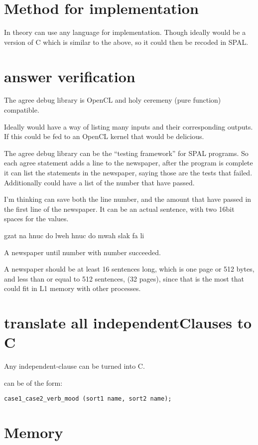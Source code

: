 \section{Method for implementation}
In theory can use any language for implementation.  
Though ideally would be a version of C which is similar to the above, 
so it could then be recoded in SPAL.\@

\section{answer verification}

The agree debug library is OpenCL and holy ceremeny (pure function) compatible. 

Ideally would have a way of listing many inputs and their corresponding outputs. 
If this could be fed to an OpenCL kernel that would be delicious. 

The agree debug library can be the ``testing framework'' for SPAL programs. 
So each agree statement adds a line to the newspaper,
after the program is complete it can list the statements in the newspaper,
saying those are the tests that failed. 
Additionally could have a list of the number that have passed.

I'm thinking can save both the line number, and the amount that have passed in
the first line of the newspaper. It can be an actual sentence, with two 16bit
spaces for the values.\ 

gzat na hnuc do lweh hnuc do mwah slak fa li

A newspaper until number with number succeeded.

A newspaper should be at least 16 sentences long, which is one page or 512
bytes, and less than or equal to 512 sentences, (32 pages), since that is the
most that could  fit in L1 memory with other processes. 

\section{translate all independentClauses to C}

Any independent-clause can be turned into C.

can be of the form:
\begin{lstlisting}
case1_case2_verb_mood (sort1 name, sort2 name); 
\end{lstlisting}

\section{Memory}

